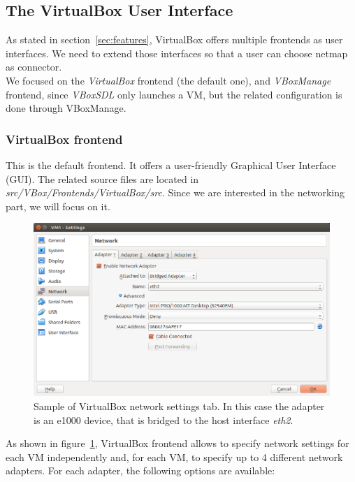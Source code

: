 \documentclass[a4paper, 12pt, titlepage]{report}
\begin{document}
\subsection{The VirtualBox User Interface} \label{subsec:vbox ui}
As stated in section~\ref{sec:features}, VirtualBox offers multiple frontends as user interfaces. We need to extend those interfaces so that a user can choose netmap as connector.
\\
We focused on the \textit{VirtualBox} frontend (the default one), and \textit{VBoxManage} frontend, since \textit{VBoxSDL} only launches a VM, but the related configuration is done through VBoxManage.

\subsubsection{VirtualBox frontend}
This is the default frontend. It offers a user-friendly Graphical User Interface (GUI). The related source files are located in \textit{src/VBox/Frontends/VirtualBox/src}. Since we are interested in the networking part, we will focus on it.
\\
\begin{figure}[!ht] 
	\centering
	\includegraphics[width=\textwidth]{img/net_settings.png}
	\caption{Sample of VirtualBox network settings tab. In this case the adapter is an e1000 device, that is bridged to the host interface \textit{eth2}.}
	\label{img:vbox_net_settings}
\end{figure}As shown in figure~\ref{img:vbox_net_settings}, VirtualBox frontend allows to specify network settings for each VM independently and, for each VM, to specify up to 4 different network adapters. For each adapter, the following options are available:
\end{document}
